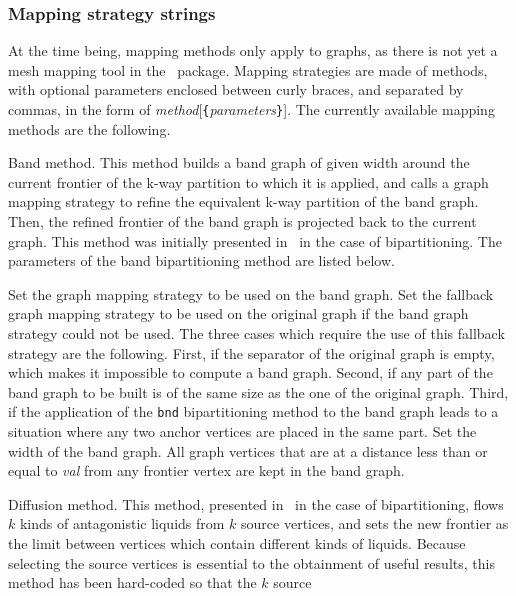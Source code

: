 \subsubsection{Mapping strategy strings}
\label{sec-lib-format-map}

At the time being, mapping methods only apply to graphs, as there is
not yet a mesh mapping tool in the \scotch\ package.
Mapping strategies are made of methods, with optional parameters enclosed
between curly braces, and separated by commas, in the form of
{\it method\/}{[{\tt \{}{\it parameters\/}{\tt \}}]}\enspace.
The currently available mapping methods are the following.

\begin{itemize}
\iteme[{\tt b}]
Band method. This method builds a band graph of given width around the
current frontier of the k-way partition to which it is applied, and
calls a graph mapping strategy to refine the equivalent k-way
partition of the band graph. Then, the refined frontier of the band
graph is projected back to the current graph. This method was
initially presented in~\cite{chpe06a} in the case of bipartitioning.
The parameters of the band bipartitioning method are listed below.
\begin{itemize}
\iteme[{\tt bnd=}{\it strat}]
Set the graph mapping strategy to be used on the band graph.
\iteme[{\tt org=}{\it strat}]
Set the fallback graph mapping strategy to be used on the
original graph if the band graph strategy could not be used. The three
cases which require the use of this fallback strategy are the
following. First, if the separator of the original graph is empty,
which makes it impossible to compute a band graph. Second, if any part
of the band graph to be built is of the same size as the one of the
original graph. Third, if the application of the {\tt bnd}
bipartitioning method to the band graph leads to a situation where any
two anchor vertices are placed in the same part.
\iteme[{\tt width=}{\it val}]
Set the width of the band graph. All graph vertices that are at a
distance less than or equal to {\it val} from any frontier vertex
are kept in the band graph.
\end{itemize}
\iteme[{\tt d}]
Diffusion method. This method, presented in~\cite{pell07b} in the case
of bipartitioning, flows $k$ kinds of antagonistic liquids from $k$
source vertices, and sets the new frontier as the limit between vertices
which contain different kinds of liquids. Because
selecting the source vertices is essential to the obtainment of useful
results, this method has been hard-coded so that the $k$ source

\end{itemize}
